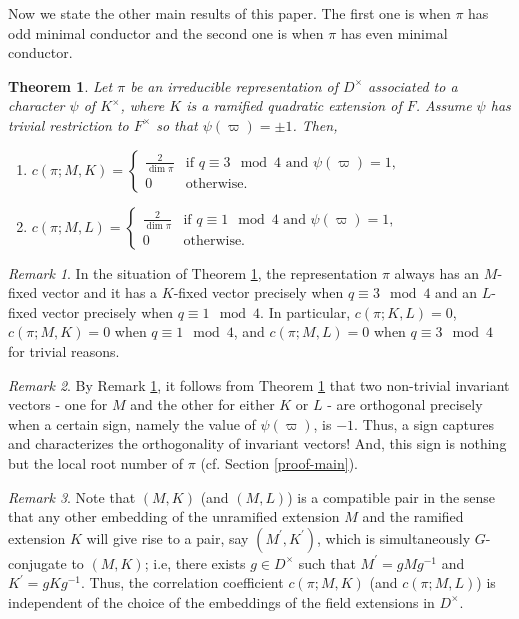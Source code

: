 \documentclass[12pt]{amsart}
\newtheorem{theorem}{Theorem}[section] %
\theoremstyle{definition}
\theoremstyle{remark}
\newtheorem{remark}{Remark}
\begin{document}
Now we state the other main results of this paper. The first one is when $\pi$ has odd minimal conductor and the second one is when $\pi$ has even minimal conductor.

\begin{theorem}\label{thm-odd}
Let $\pi$ be an irreducible representation of $D^\times$ associated to a character $\psi$ of $K^\times$, where $K$ is a ramified quadratic extension of $F$. Assume $\psi$ has trivial restriction to $F^\times$ so that $\psi(\varpi) = \pm 1$. Then,
\begin{enumerate}
\item $c(\pi; M, K) =
\begin{cases}
\frac{2}{\dim \pi}  &\text{if $q \equiv 3 \mod 4$ and $\psi(\varpi) = 1$,} \\
0 &\text{otherwise.} 
\end{cases}$
\item $c(\pi; M, L) = 
\begin{cases}
\frac{2}{\dim \pi}  &\text{if $q \equiv 1 \mod 4$ and $\psi(\varpi) = 1$,} \\
0 &\text{otherwise.} 
\end{cases}$
\end{enumerate}
\end{theorem}
\begin{remark}\label{trivial}
In the situation of Theorem \ref{thm-odd}, the representation $\pi$ always has an $M$-fixed vector and it has a $K$-fixed vector precisely when $q \equiv 3 \mod 4$ and an $L$-fixed vector precisely when $q \equiv 1 \mod 4$. In particular, $c(\pi;K,L) = 0$, $c(\pi; M, K) = 0$ when $q \equiv 1 \mod 4$, and $c(\pi; M, L) = 0$ when $q \equiv 3 \mod 4$ for trivial reasons.
\end{remark}
\begin{remark}
By Remark \ref{trivial}, it follows from Theorem \ref{thm-odd} that two non-trivial invariant vectors - one for $M$ and the other for either $K$ or $L$ - are orthogonal precisely when a certain sign, namely the value of $\psi(\varpi)$, is $-1$. Thus, a sign captures and characterizes the orthogonality of invariant vectors! And, this sign is nothing but the local root number of $\pi$ (cf. Section \ref{proof-main}).
\end{remark}
\begin{remark}\label{compatible}
Note that $(M,K)$ (and $(M,L)$) is a compatible pair in the sense that any other embedding of the unramified extension $M$ and the ramified extension $K$ will give rise to a pair, say $(M^\prime,K^\prime)$, which is simultaneously $G$-conjugate to $(M,K)$; i.e, there exists $g \in D^\times$ such that $M^\prime = g Mg^{-1}$ and $K^\prime = gKg^{-1}$. Thus, the correlation coefficient $c(\pi;M,K)$ (and $c(\pi;M,L)$) is independent of the choice of the embeddings of the field extensions in $D^\times$.
\end{remark}
\end{document}
